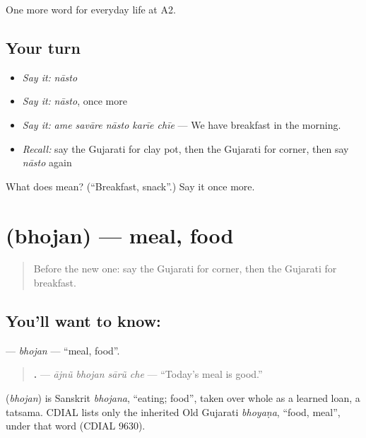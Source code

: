 \begin{grammarlens}[title={What you've built}]
One more word for everyday life at A2.
\end{grammarlens}

\subsection*{Your turn}
\begin{itemize}
\raggedright
  \item \emph{Say it:} \emph{nāsto}
  \item \emph{Say it:} \emph{nāsto}, once more
  \item \emph{Say it:} \emph{ame savāre nāsto karīe chīe} — We have breakfast in the morning.
  \item \emph{Recall:} say the Gujarati for clay pot, then the Gujarati for corner, then say \emph{nāsto} again
\end{itemize}

\begin{tcolorbox}[breakable,colback=teal!4,colframe=teal!35!black,title={Before you move on}]
What does  mean? (\textquotedblleft{}Breakfast, snack\textquotedblright{}.) Say it once more.
\end{tcolorbox}
\section[\texorpdfstring{\gu{ભોજન} (bhojan)}{ભોજન (bhojan)}]{ (bhojan) — meal, food}

\label{lesson:GU-C163-bhojan}



\begin{quote}
Before the new one: say the Gujarati for corner, then the Gujarati for breakfast.
\end{quote}

\subsection*{You'll want to know: }
\textbf{} — \emph{bhojan} — \textquotedblleft{}meal, food\textquotedblright{}.

\begin{quote}
\textbf{   .} — \emph{ājnũ bhojan sārũ che} — \textquotedblleft{}Today's meal is good.\textquotedblright{}
\end{quote}

\begin{cousinweb}
\textbf{} (\emph{bhojan}) is Sanskrit \emph{bhojana}, \textquotedblleft{}eating; food\textquotedblright{}, taken over whole as a learned loan, a tatsama. CDIAL lists only the inherited Old Gujarati \emph{bhoyaṇa}, \textquotedblleft{}food, meal\textquotedblright{}, under that word (CDIAL 9630).
\end{cousinweb}

